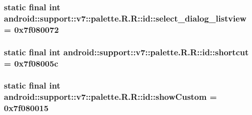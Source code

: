 \hypertarget{classandroid_1_1support_1_1v7_1_1palette_1_1_r_1_1id_a15dcb5a5e30a5f97d4ef6863622b315}{
\subsubsection[{select\_\-dialog\_\-listview}]{\setlength{\rightskip}{0pt plus 5cm}static final int android::support::v7::palette.R.R::id::select\_\-dialog\_\-listview = 0x7f080072}}
\label{classandroid_1_1support_1_1v7_1_1palette_1_1_r_1_1id_a15dcb5a5e30a5f97d4ef6863622b315}


\hypertarget{classandroid_1_1support_1_1v7_1_1palette_1_1_r_1_1id_f07bcde911280516d6ed6adbb1fa6a0e}{
\subsubsection[{shortcut}]{\setlength{\rightskip}{0pt plus 5cm}static final int android::support::v7::palette.R.R::id::shortcut = 0x7f08005c}}
\label{classandroid_1_1support_1_1v7_1_1palette_1_1_r_1_1id_f07bcde911280516d6ed6adbb1fa6a0e}


\hypertarget{classandroid_1_1support_1_1v7_1_1palette_1_1_r_1_1id_d14bcf5b375d7ffe5862837d08aa30d5}{
\subsubsection[{showCustom}]{\setlength{\rightskip}{0pt plus 5cm}static final int android::support::v7::palette.R.R::id::showCustom = 0x7f080015}}
\label{classandroid_1_1support_1_1v7_1_1palette_1_1_r_1_1id_d14bcf5b375d7ffe5862837d08aa30d5}


